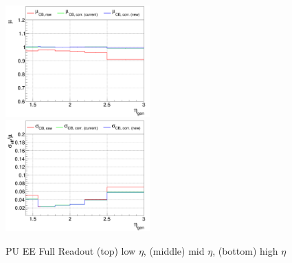 \begin{figure}
\includegraphics[width=0.495\textwidth]{./plots_pdf/ECAL_plots/plotsPU/EE/FULL/pdf/GENETA/EEFULL_GENETA_0100_0300_MuOverBins.pdf}
\includegraphics[width=0.495\textwidth]{./plots_pdf/ECAL_plots/plotsPU/EE/FULL/pdf/GENETA/EEFULL_GENETA_0100_0300_EffSigmaOverBins.pdf}


\caption [Energy response of PF ECAL cluster vs $\eta$ for PU EE Full readout senario]{PU EE Full Readout (top) low $\eta$, (middle) mid $\eta$, (bottom) high $\eta$}
\label{fig:PU_EEFULL_eta}
\end{figure}






